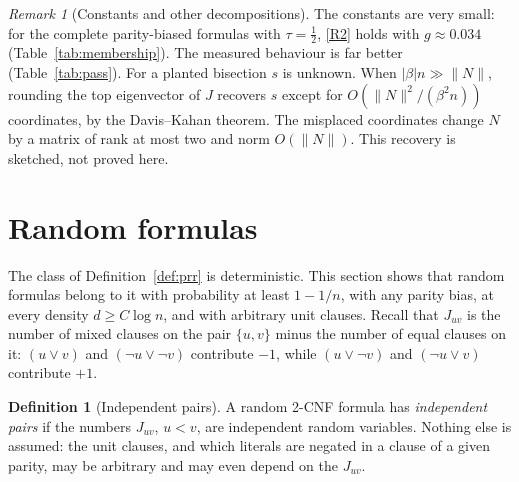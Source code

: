 \documentclass[11pt,a4paper]{article}
\theoremstyle{definition}
\newtheorem{definition}[theorem]{Definition}
\theoremstyle{remark}
\newtheorem{remark}[theorem]{Remark}
\begin{document}
\begin{remark}[Constants and other decompositions]
The constants are very small: for the complete parity-biased formulas with
$\tau=\frac12$, \eqref{R2} holds with $g\approx0.034$
(Table~\ref{tab:membership}). The measured behaviour is far better
(Table~\ref{tab:pass}). For a planted bisection $s$ is unknown.
When $|\beta|n\gg\|N\|$, rounding the top eigenvector of $J$ recovers $s$
except for $O(\|N\|^2/(\beta^2n))$ coordinates, by the Davis--Kahan theorem.
The misplaced coordinates change $N$ by a matrix of rank at most two and norm
$O(\|N\|)$. This recovery is sketched, not proved here.
\end{remark}

\section{Random formulas}\label{sec:random}

The class of Definition~\ref{def:prr} is deterministic. This section shows that
random formulas belong to it with probability at least $1-1/n$, with any parity
bias, at every density $d\ge C\log n$, and with arbitrary unit clauses. Recall
that $J_{uv}$ is the number of mixed clauses on the pair $\{u,v\}$ minus the
number of equal clauses on it: $(u\lor v)$ and $(\neg u\lor\neg v)$ contribute
$-1$, while $(u\lor\neg v)$ and $(\neg u\lor v)$ contribute $+1$.

\begin{definition}[Independent pairs]\label{def:indep}
A random 2-CNF formula has \emph{independent pairs} if the numbers $J_{uv}$,
$u<v$, are independent random variables. Nothing else is assumed: the unit
clauses, and which literals are negated in a clause of a given parity, may be
arbitrary and may even depend on the $J_{uv}$.
\end{definition}
\end{document}
